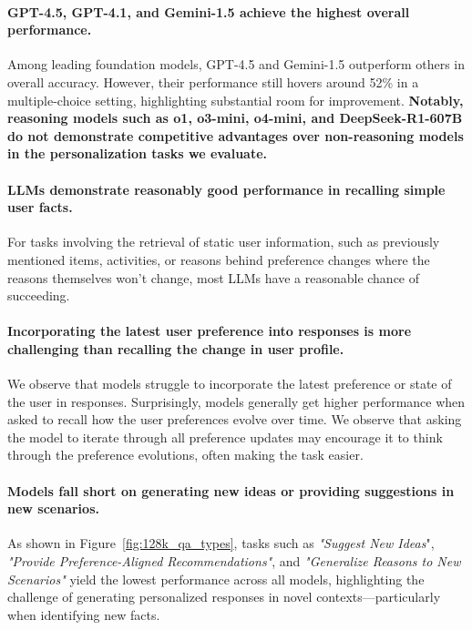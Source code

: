 \paragraph{GPT-4.5, GPT-4.1, and Gemini-1.5 achieve the highest overall performance.}
Among leading foundation models, GPT-4.5 and Gemini-1.5 outperform others in overall accuracy. However, their performance still hovers around 52\% in a multiple-choice setting, highlighting substantial room for improvement. \textbf{Notably, reasoning models such as o1, o3-mini, o4-mini, and DeepSeek-R1-607B do not demonstrate competitive advantages over non-reasoning models in the personalization tasks we evaluate.}

\paragraph{LLMs demonstrate reasonably good performance in recalling simple user facts.}
    For tasks involving the retrieval of static user information, such as previously mentioned items, activities, or reasons behind preference changes where the reasons themselves won't change, most LLMs have a reasonable chance of succeeding.
    
\paragraph{Incorporating the latest user preference into responses is more challenging than recalling the change in user profile.} We observe that models struggle to incorporate the latest preference or state of the user in responses. Surprisingly, models generally get higher performance when asked to recall how the user preferences evolve over time. 
We observe that asking the model to iterate through all preference updates may encourage it to think through the preference evolutions, often making the task easier.
    
\paragraph{Models fall short on generating new ideas or providing suggestions in new scenarios.}
    As shown in Figure~\ref{fig:128k_qa_types}, tasks such as \textit{"Suggest New Ideas}", \textit{"Provide Preference-Aligned Recommendations"}, and \textit{"Generalize Reasons to New Scenarios"} yield the lowest performance across all models, highlighting the challenge of generating personalized responses in novel contexts—particularly when identifying new facts.


